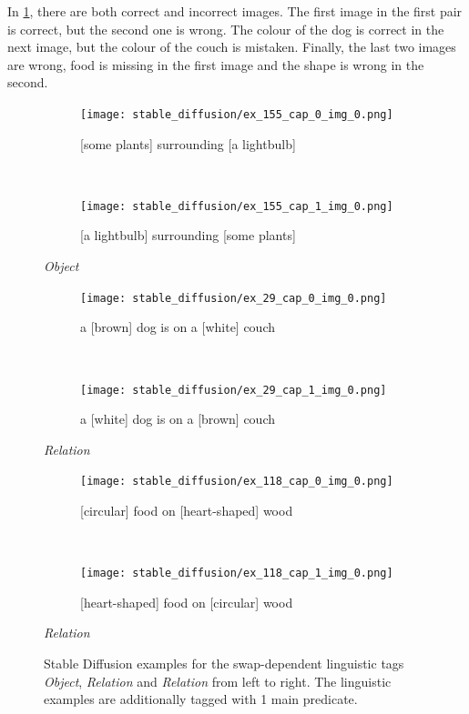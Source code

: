 In \cref{fig:stable-diffusion-examples}, there are both correct and incorrect images. The first image in the first pair is correct, but the second one is wrong. The colour of the dog is correct in the next image, but the colour of the couch is mistaken. Finally, the last two images are wrong, food is missing in the first image and the shape is wrong in the second.

\begin{figure}[ht]
\centering
    \begin{minipage}[t]{.30\textwidth}
        \begin{subfigure}[t]{\textwidth}
        \centering
        \texttt{[image: stable\_diffusion/ex\_155\_cap\_0\_img\_0.png]}
        \caption{[some plants] surrounding [a lightbulb]}
        \end{subfigure}\\
        \begin{subfigure}[t]{\textwidth}
        \centering
        \texttt{[image: stable\_diffusion/ex\_155\_cap\_1\_img\_0.png]}
        \caption{[a lightbulb] surrounding [some plants]}
        \end{subfigure}%
        \caption*{\textit{Object}}
    \end{minipage}
    \hfill
    \begin{minipage}[t]{.30\textwidth}
        \begin{subfigure}[t]{\textwidth}
        \centering
        \texttt{[image: stable\_diffusion/ex\_29\_cap\_0\_img\_0.png]}
        \caption{a [brown] dog is on a [white] couch}
        \end{subfigure}\\
        \vspace{10pt}
        \begin{subfigure}[t]{\textwidth}
        \centering
        \texttt{[image: stable\_diffusion/ex\_29\_cap\_1\_img\_0.png]}
        \caption{a [white] dog is on a [brown] couch}
        \end{subfigure}%
        \vspace{10pt}
        \caption*{\textit{Relation}}
    \end{minipage}
    \hfill
    \begin{minipage}[t]{.30\textwidth}
        \begin{subfigure}[t]{\textwidth}
        \centering
        \texttt{[image: stable\_diffusion/ex\_118\_cap\_0\_img\_0.png]}
        \caption{[circular] food on [heart-shaped] wood}
        \end{subfigure}\\
        \begin{subfigure}[t]{\textwidth}
        \centering
        \texttt{[image: stable\_diffusion/ex\_118\_cap\_1\_img\_0.png]}
        \caption{[heart-shaped] food on [circular] wood}
        \end{subfigure}%
        \caption*{\textit{Relation}}
    \end{minipage}%
    \caption{Stable Diffusion examples for the swap-dependent linguistic tags \textit{Object}, \textit{Relation} and \textit{Relation} from left to right. The linguistic examples are additionally tagged with 1 main predicate.}
    \label{fig:stable-diffusion-examples}
\end{figure}

